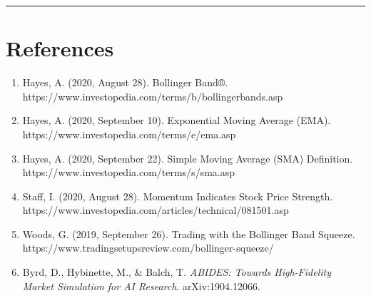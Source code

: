 \documentclass[
  11pt,
]{article}
\providecommand{\tightlist}{%
  \setlength{\itemsep}{0pt}\setlength{\parskip}{0pt}}
\begin{document}
\begin{center}\rule{0.5\linewidth}{0.5pt}\end{center}

\section{References}\label{references}

\begin{enumerate}
\def\labelenumi{\arabic{enumi}.}
\tightlist
\item
  Hayes, A. (2020, August 28). Bollinger Band®.
  https://www.investopedia.com/terms/b/bollingerbands.asp\\
\item
  Hayes, A. (2020, September 10). Exponential Moving Average (EMA).
  https://www.investopedia.com/terms/e/ema.asp\\
\item
  Hayes, A. (2020, September 22). Simple Moving Average (SMA)
  Definition. https://www.investopedia.com/terms/s/sma.asp\\
\item
  Staff, I. (2020, August 28). Momentum Indicates Stock Price Strength.
  https://www.investopedia.com/articles/technical/081501.asp\\
\item
  Woods, G. (2019, September 26). Trading with the Bollinger Band
  Squeeze. https://www.tradingsetupsreview.com/bollinger-squeeze/\\
\item
  Byrd, D., Hybinette, M., \& Balch, T. \emph{ABIDES: Towards
  High-Fidelity Market Simulation for AI Research}. arXiv:1904.12066.
\end{enumerate}
\end{document}
